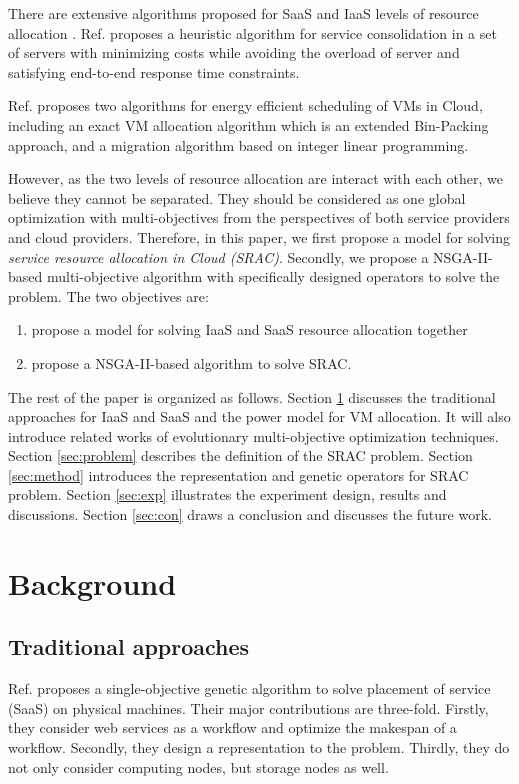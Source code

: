 There are extensive algorithms proposed for SaaS and IaaS levels of resource allocation \cite{Mazumdar20174, dubois2015autonomic}.
Ref. \cite{Service_2} proposes a heuristic algorithm for service consolidation in a set of servers with minimizing costs while avoiding the overload of server and satisfying end-to-end response time constraints. 

Ref. \cite{Energy_8} proposes two algorithms for energy efficient scheduling of VMs in Cloud, including an exact VM allocation algorithm which is an extended Bin-Packing approach, and a migration algorithm based on integer linear programming. 

However, as the two levels of resource allocation are interact with each other, we believe they cannot be separated. They should be considered as one global optimization with multi-objectives from the perspectives of both service providers and cloud providers. Therefore, in this paper, we first propose a model for solving \textit{service resource allocation in Cloud (SRAC)}. Secondly, we propose a NSGA-II-based multi-objective algorithm with specifically designed operators to solve the problem. The two objectives are:

\begin{enumerate}
  \item propose a model for solving IaaS and SaaS resource allocation together
  \item propose a NSGA-II-based algorithm to solve SRAC.
\end{enumerate}


The rest of the paper is organized as follows. Section \ref{sec:back} discusses the traditional 
approaches for IaaS and SaaS and the power model for VM allocation. It will also introduce
related works of evolutionary multi-objective optimization techniques. Section \ref{sec:problem} describes the 
definition of the SRAC problem. Section \ref{sec:method} introduces the representation and genetic operators for SRAC problem. Section \ref{sec:exp} illustrates the experiment design, results and discussions. Section \ref{sec:con} draws a conclusion and discusses the future work.


\section{Background}
\label{sec:back}
\subsection{Traditional approaches}
Ref. \cite{ga_saas} proposes a single-objective genetic algorithm to solve placement of service (SaaS) on physical machines. Their major contributions are three-fold. Firstly, they consider web services as a workflow and optimize the makespan of a workflow. Secondly, they design a representation to the problem. Thirdly, they do not only consider computing 
nodes, but storage nodes as well.

